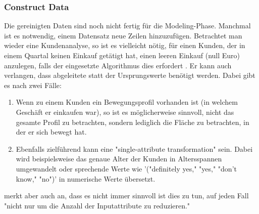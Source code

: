 \subsubsection{Construct Data}
Die gereinigten Daten sind noch nicht fertig für die Modeling-Phase. Manchmal ist es notwendig, einem Datensatz neue Zeilen hinzuzufügen. Betrachtet man wieder eine Kundenanalyse, so ist es vielleicht nötig, für einen Kunden, der in einem Quartal keinen Einkauf getätigt hat, einen leeren Einkauf (null Euro) anzulegen, falls der eingesetzte Algorithmus dies erfordert \citep[S.~22]{chapman_crisp-dm_2000}. Er kann auch verlangen, dass abgeleitete  statt der Ursprungswerte benötigt werden. Dabei gibt es nach \citep[S.~16]{shearer_crisp-dm_2000} zwei Fälle:
\begin{enumerate}
\item Wenn zu einem Kunden ein Bewegungsprofil vorhanden ist (in welchem Geschäft er einkaufen war), so ist es möglicherweise sinnvoll, nicht das gesamte Profil zu betrachten, sondern lediglich die Fläche zu betrachten, in der er sich bewegt hat.
\item Ebenfalls zielführend kann eine "single-attribute transformation" sein. Dabei wird beispielsweise das genaue Alter der Kunden in Altersspannen umgewandelt oder sprechende Werte wie '("definitely yes," "yes," "don't know," "no")' in numerische Werte übersetzt.
\end{enumerate}
\citep[S.~16; eigene Übersetzung]{shearer_crisp-dm_2000} merkt aber auch an, dass es nicht immer sinnvoll ist dies zu tun, auf jeden Fall "nicht nur um die Anzahl der Inputattribute zu reduzieren."

